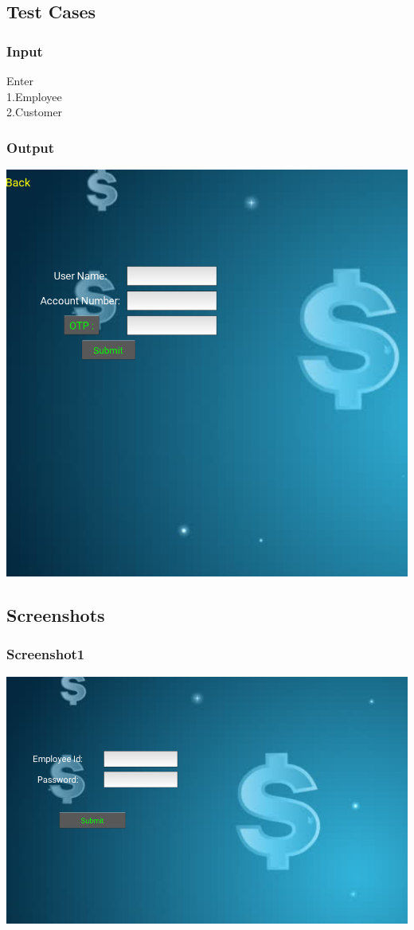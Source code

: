 \documentclass[12pt]{article}
\begin{document}
 \newpage
  \subsection{Test Cases}
  
	\subsubsection{Input}
	Enter\\
1.Employee\\
2.Customer\\
\subsubsection{Output}
\includegraphics[width=\linewidth]{Lab_5.png}
\subsection{Screenshots}
\subsubsection{Screenshot1}
\includegraphics[width=\linewidth]{lab11_1.png}
\end{document}
